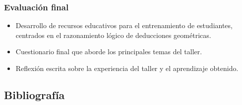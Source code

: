 \subsubsection{Evaluación final}

\begin{itemize}
	\item Desarrollo de recursos educativos para el entrenamiento de estudiantes, centrados en el razonamiento lógico de deducciones geométricas.
	\item Cuestionario final que aborde los principales temas del taller.
	\item Reflexión escrita sobre la experiencia del taller y el aprendizaje obtenido.
\end{itemize}

\subsection{Bibliografía}

\nocite{*}
\printbibliography[keyword={01}]